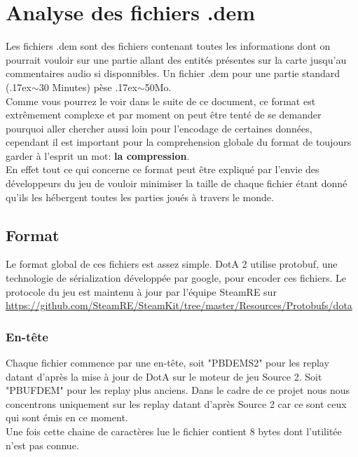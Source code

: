 \documentclass{article}
\begin{document}
\section{Analyse des fichiers .dem}

Les fichiers .dem sont des fichiers contenant toutes les informations dont on pourrait vouloir sur une partie allant des entités présentes sur la carte jusqu'au commentaires audio si disponnibles. Un fichier .dem pour une partie standard ({\raise.17ex\hbox{$\scriptstyle\mathtt{\sim}$}}30 Minutes) pèse {\raise.17ex\hbox{$\scriptstyle\mathtt{\sim}$}}50Mo.\\
Comme vous pourrez le voir dans le suite de ce document, ce format est extrêmement complexe et par moment on peut être tenté de se demander pourquoi aller chercher aussi loin pour l'encodage de certaines données, cependant il est important pour la comprehension globale du format de toujours garder à l'esprit un mot: \textbf{la compression}.\\
 En effet tout ce qui concerne ce format peut être expliqué par l'envie des développeurs du jeu de vouloir minimiser la taille de chaque fichier étant donné qu'ils les hébergent toutes les parties joués à travers le monde. 

\subsection{Format}

Le format global de ces fichiers est assez simple. DotA 2 utilise protobuf, une technologie de sérialization développée par google, pour encoder ces fichiers. Le protocole du jeu est maintenu à jour par l'équipe SteamRE sur \url{https://github.com/SteamRE/SteamKit/tree/master/Resources/Protobufs/dota} \\

\subsubsection{En-tête}
Chaque fichier commence par une en-tête, soit "PBDEMS2" pour les replay datant d'après la mise à jour de DotA sur le moteur de jeu Source 2. Soit "PBUFDEM" pour les replay plus anciens. Dans le cadre de ce projet nous nous concentrons uniquement sur les replay datant d'après Source 2 car ce sont ceux qui sont émis en ce moment.\\
Une fois cette chaine de caractères lue le fichier contient 8 bytes dont l'utilitée n'est pas connue.\\
\end{document}
